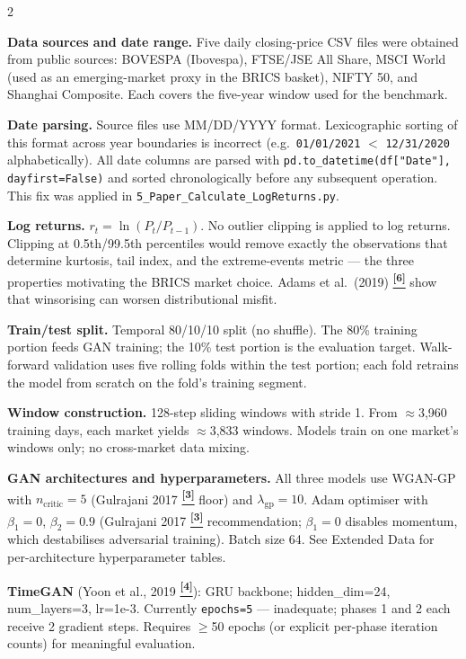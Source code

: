\documentclass[10pt]{article}
\newcommand{\tcite}[1]{%
  \hyperlink{R:#1}{\textsuperscript{\scriptsize\textbf{[#1]}}}}
\begin{document}
\begin{multicols}{2}
\small

\textbf{Data sources and date range.}
Five daily closing-price CSV files were obtained from public sources: BOVESPA (Ibovespa), FTSE/JSE All Share, MSCI World (used as an emerging-market proxy in the BRICS basket), NIFTY 50, and Shanghai Composite. Each covers the five-year window used for the benchmark.

\textbf{Date parsing.}
Source files use MM/DD/YYYY format. Lexicographic sorting of this format across year boundaries is incorrect (e.g.\ \texttt{01/01/2021} $<$ \texttt{12/31/2020} alphabetically). All date columns are parsed with \texttt{pd.to\_datetime(df["Date"], dayfirst=False)} and sorted chronologically before any subsequent operation. This fix was applied in \texttt{5\_Paper\_Calculate\_LogReturns.py}.

\textbf{Log returns.}
$r_t = \ln(P_t / P_{t-1})$. No outlier clipping is applied to log returns. Clipping at 0.5th/99.5th percentiles would remove exactly the observations that determine kurtosis, tail index, and the extreme-events metric --- the three properties motivating the BRICS market choice. Adams et al.\ (2019)\tcite{6} show that winsorising can worsen distributional misfit.

\textbf{Train/test split.}
Temporal 80/10/10 split (no shuffle). The 80\% training portion feeds GAN training; the 10\% test portion is the evaluation target. Walk-forward validation uses five rolling folds within the test portion; each fold retrains the model from scratch on the fold's training segment.

\textbf{Window construction.}
128-step sliding windows with stride 1. From $\approx$3{,}960 training days, each market yields $\approx$3{,}833 windows. Models train on one market's windows only; no cross-market data mixing.

\textbf{GAN architectures and hyperparameters.}
All three models use WGAN-GP with $n_\text{critic}=5$ (Gulrajani 2017\tcite{3} floor) and $\lambda_\text{gp}=10$. Adam optimiser with $\beta_1=0$, $\beta_2=0.9$ (Gulrajani 2017\tcite{3} recommendation; $\beta_1=0$ disables momentum, which destabilises adversarial training). Batch size 64. See Extended Data for per-architecture hyperparameter tables.

\textbf{TimeGAN} (Yoon et al., 2019\tcite{4}): GRU backbone; hidden\_dim=24, num\_layers=3, lr=1e-3. Currently \texttt{epochs=5} --- inadequate; phases 1 and 2 each receive 2 gradient steps. Requires $\geq$50 epochs (or explicit per-phase iteration counts) for meaningful evaluation.


\end{multicols}
\end{document}
